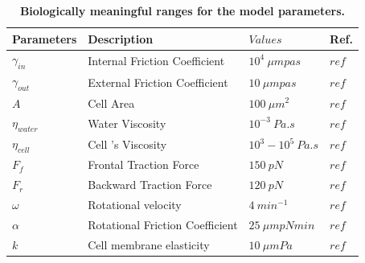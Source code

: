 \documentclass[10pt,letterpaper]{article}
\begin{document}
\begin{enumerate}
\begin{table}[!ht]
\begin{adjustwidth}{0in}{0in} %
\centering
\caption{{\bf  Biologically meaningful ranges for the model parameters.}}
\begin{tabular}{l   l l l}
\hline\hline
 \textbf{Parameters}&\textbf{Description}  &  \textbf{$Values$} & \textbf{Ref.} \\ \hline
$\gamma_{in}$&Internal Friction Coefficient  &  $10^4~ \mu m pa s$ & $ref$  \\
$\gamma_{out}$&External Friction Coefficient  &  $10 ~\mu m pa s$ & $ref$  \\
$A$& Cell Area  &  $ 100~\mu m^2$ & $ref$  \\
$\eta_{water}$&Water Viscosity &  $10^{-3}~ Pa.s$ & $ref$  \\
$\eta_{cell}$& Cell 's Viscosity &  $10^3-10^5~  Pa.s$ & $ref$  \\
$F_{f}$& Frontal Traction Force  &  $150~ pN $ & $ref$  \\
$F_{r}$& Backward Traction Force  &  $ 120~ pN$ & $ref$  \\
$\omega$& Rotational velocity  &  $4 ~min^{-1}$ & $ref$  \\ 
$\alpha$& Rotational Friction Coefficient  &  $25~ \mu m pN min$ & $ref$  \\
$k$& Cell membrane elasticity &  $10~\mu m Pa$ & $ref$  \\ \hline


\end{tabular}
\end{adjustwidth}
\end{table}
\end{enumerate}
\end{document}
